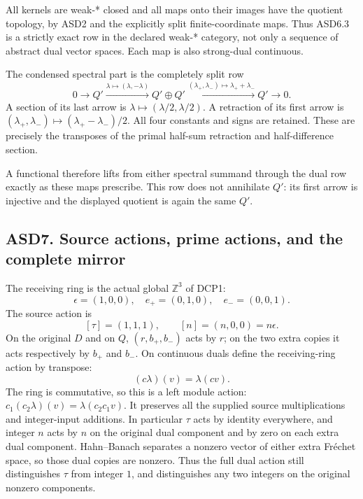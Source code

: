All kernels are weak-* closed and all maps onto their images have the
quotient topology, by ASD2 and the explicitly split finite-coordinate
maps. Thus ASD6.3 is a strictly exact row in the declared weak-*
category, not only a sequence of abstract dual vector spaces. Each map
is also strong-dual continuous.

The condensed spectral part is the completely split row \[
 0\to Q'\xrightarrow{\lambda\mapsto(\lambda,-\lambda)}
 Q'\oplus Q'\xrightarrow{(\lambda_+,\lambda_-)\mapsto\lambda_++\lambda_-}
 Q'\to0.
 \tag{ASD6.5}
\] A section of its last arrow is
\(\lambda\mapsto(\lambda/2,\lambda/2)\). A retraction of its first arrow
is \((\lambda_+,\lambda_-)\mapsto(\lambda_+-\lambda_-)/2\). All four
constants and signs are retained. These are precisely the transposes of
the primal half-sum retraction and half-difference section.

A functional therefore lifts from either spectral summand through the
dual row exactly as these maps prescribe. This row does not annihilate
\(Q'\): its first arrow is injective and the displayed quotient is again
the same \(Q'\).

\subsection{ASD7. Source actions, prime actions, and the complete
mirror}\label{asd7.-source-actions-prime-actions-and-the-complete-mirror}

The receiving ring is the actual global \(\mathbb Z^3\) of DCP1: \[
 \epsilon=(1,0,0),\quad e_+=(0,1,0),\quad e_-=(0,0,1).
\] The source action is \[
 [\tau]=(1,1,1),\qquad[n]=(n,0,0)=n\epsilon .
 \tag{ASD7.1}
\] On the original \(D\) and on \(Q\), \((r,b_+,b_-)\) acts by \(r\); on
the two extra copies it acts respectively by \(b_+\) and \(b_-\). On
continuous duals define the receiving-ring action by transpose: \[
 (c\lambda)(v)=\lambda(cv).
 \tag{ASD7.2}
\] The ring is commutative, so this is a left module action:
\(c_1(c_2\lambda)(v)=\lambda(c_2c_1v)\). It preserves all the supplied
source multiplications and integer-input additions. In particular
\(\tau\) acts by identity everywhere, and integer \(n\) acts by \(n\) on
the original dual component and by zero on each extra dual component.
Hahn--Banach separates a nonzero vector of either extra Fréchet space,
so those dual copies are nonzero. Thus the full dual action still
distinguishes \(\tau\) from integer \(1\), and distinguishes any two
integers on the original nonzero components.

